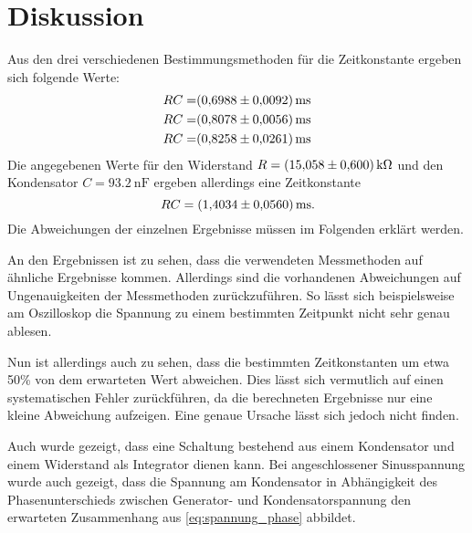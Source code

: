 \section{Diskussion}
\label{sec:Diskussion}



Aus den drei verschiedenen Bestimmungsmethoden für die Zeitkonstante ergeben sich folgende Werte:
\begin{align}
    RC =& \SI{0.6988+-0.0092}{\milli\second} \\
    RC =& \SI{0.8078+-0.0056}{\milli\second} \\
    RC =& \SI{0.8258+-0.0261}{\milli\second}
\end{align}
Die angegebenen Werte für den Widerstand $R=\SI{15.058+-0.6}{\kilo\ohm}$ und den Kondensator $C=\SI{93.2}{\nano\farad}$ ergeben allerdings eine Zeitkonstante
\begin{equation}
    RC = \SI{1.4034+-0.056}{\milli\second}.
\end{equation}
Die Abweichungen der einzelnen Ergebnisse müssen im Folgenden erklärt werden.

An den Ergebnissen ist zu sehen, dass die verwendeten Messmethoden auf ähnliche Ergebnisse kommen.
Allerdings sind die vorhandenen Abweichungen auf Ungenauigkeiten der Messmethoden zurückzuführen. So lässt sich beispielsweise am Oszilloskop die Spannung zu einem bestimmten Zeitpunkt nicht sehr genau ablesen. 

Nun ist allerdings auch zu sehen, dass die bestimmten Zeitkonstanten um etwa 50\% von dem erwarteten Wert abweichen. Dies lässt sich vermutlich auf einen systematischen Fehler zurückführen, da die berechneten Ergebnisse nur eine kleine Abweichung aufzeigen. Eine genaue Ursache lässt sich jedoch nicht finden.

Auch wurde gezeigt, dass eine Schaltung bestehend aus einem Kondensator und einem Widerstand als Integrator dienen kann. Bei angeschlossener Sinusspannung wurde auch gezeigt, dass die Spannung am Kondensator in Abhängigkeit des Phasenunterschieds zwischen Generator- und Kondensatorspannung den erwarteten Zusammenhang aus \autoref{eq:spannung_phase} abbildet.
